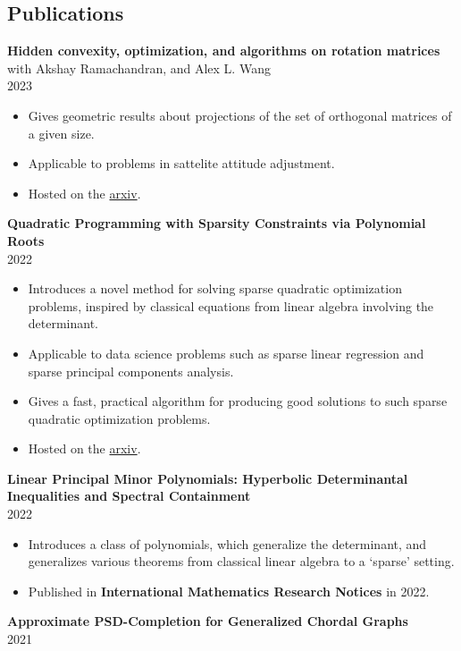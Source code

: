 \documentclass[margin]{res}
\begin{document}
\begin{resume}
\section{Publications}
{\bf  Hidden convexity, optimization, and algorithms on rotation matrices  } with Akshay Ramachandran, and Alex L. Wang\\ 2023
\begin{itemize} \itemsep -2pt %
\item Gives geometric results about projections of the set of orthogonal matrices of a given size.
\item Applicable to problems in sattelite attitude adjustment.
\item Hosted on the \href{https://arxiv.org/search/?query=kevin+shu&searchtype=all&source=header}{arxiv}.
\end{itemize}
{\bf  Quadratic Programming with Sparsity Constraints via Polynomial Roots } \\ 2022
\begin{itemize} \itemsep -2pt %
\item Introduces a novel method for solving sparse quadratic optimization problems, inspired by classical equations from linear algebra involving the determinant.
\item Applicable to data science problems such as sparse linear regression and sparse principal components analysis.
\item Gives a fast, practical algorithm for producing good solutions to such sparse quadratic optimization problems.
\item Hosted on the \href{https://arxiv.org/abs/2208.11143}{arxiv}.
\end{itemize}
{\bf  Linear Principal Minor Polynomials: Hyperbolic Determinantal Inequalities and Spectral Containment } \\ 2022
\begin{itemize} \itemsep -2pt %
\item Introduces a class of polynomials, which generalize the determinant, and generalizes various theorems from classical linear algebra to a `sparse' setting.
\item Published in \textbf{International Mathematics Research Notices} in 2022.
\end{itemize}
{\bf  Approximate PSD-Completion for Generalized Chordal Graphs  } \\ 2021
\begin{itemize} \itemsep -2pt %

\end{itemize}
\end{resume}
\end{document}
